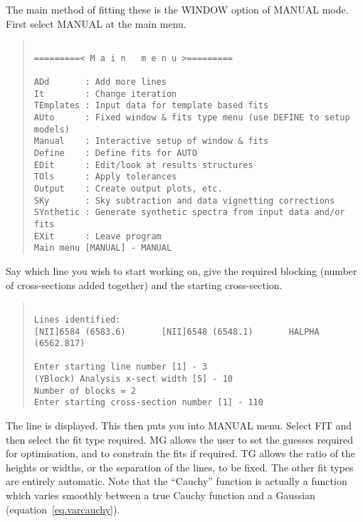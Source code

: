 The main method of fitting these is the WINDOW option of MANUAL mode.
First select MANUAL at the main menu.
\begin{quote}\begin{verbatim}

=========< M a i n   m e n u >=========

ADd       : Add more lines
It        : Change iteration
TEmplates : Input data for template based fits
AUto      : Fixed window & fits type menu (use DEFINE to setup models)
Manual    : Interactive setup of window & fits
Define    : Define fits for AUTO
EDit      : Edit/look at results structures
TOls      : Apply tolerances
Output    : Create output plots, etc.
SKy       : Sky subtraction and data vignetting corrections
SYnthetic : Generate synthetic spectra from input data and/or fits
EXit      : Leave program
Main menu [MANUAL] - MANUAL
\end{verbatim}\end{quote}
Say which line you wish to start working on, give the required blocking
(number of cross-sections added together) and the starting
cross-section.
\begin{quote}\begin{verbatim}

Lines identified:
[NII]6584 (6583.6)       [NII]6548 (6548.1)       HALPHA (6562.817)

Enter starting line number [1] - 3
(YBlock) Analysis x-sect width [5] - 10
Number of blocks = 2
Enter starting cross-section number [1] - 110
\end{verbatim}\end{quote}
The line is displayed.
This then puts you into MANUAL menu. Select FIT and then select the fit
type required.
MG allows the user to set the guesses required for
optimisation, and to constrain the fits if required. TG allows the
ratio of the heights or widths, or the separation of the lines, to be
fixed. The other fit types are entirely automatic. Note that the
``Cauchy'' function is actually a function which varies smoothly
between a true Cauchy function and a Gaussian
(equation~\ref{eq.varcauchy}).
